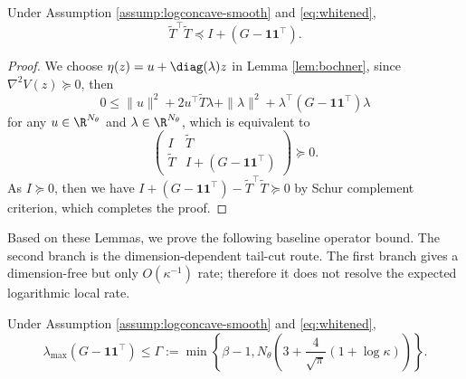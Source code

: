 \begin{lemma}\label{lem:matrix-schur}
    Under Assumption \ref{assump:logconcave-smooth} and \eqref{eq:whitened}, 
    \begin{equation*}
        \widetilde{T}^\top \widetilde{T} \preceq I + (G - \mathbf{1} \mathbf{1}^\top).
    \end{equation*}
\end{lemma}

\begin{proof}
    We choose $\eta (z) = u + \diag (\lambda) z$ in Lemma \ref{lem:bochner}, since $\nabla^2 V(z) \succeq 0$, then
    \begin{equation*}
        0 \leq  \|u\|^2 + 2 u^\top \widetilde{T} \lambda + \|\lambda\|^2 + \lambda^\top (G - \mathbf{1} \mathbf{1}^\top) \lambda
    \end{equation*}
    for any $u \in \R^{N_\theta}$ and $\lambda \in \R^{N_\theta}$, which is equivalent to 
    \begin{equation*}
        \begin{pmatrix}
            I & \widetilde{T} \\
            \widetilde{T} & I + (G - \mathbf{1} \mathbf{1}^\top)
        \end{pmatrix} \succeq 0.
    \end{equation*}
    As $I \succeq 0$, then we have $I + (G - \mathbf{1} \mathbf{1}^\top) - \widetilde{T}^\top \widetilde{T} \succeq 0$ by Schur complement criterion, which completes the proof.
\end{proof}

Based on these Lemmas, we prove the following baseline operator bound. The second branch is the dimension-dependent tail-cut route. The first branch gives a dimension-free but only $O(\kappa^{-1})$ rate; therefore it does not resolve the expected logarithmic local rate.

\begin{lemma}\label{lem:operator-bound}
    Under Assumption \ref{assump:logconcave-smooth} and \eqref{eq:whitened}, 
    \begin{equation*}
        \lambda_{\max} (G - \mathbf{1} \mathbf{1}^\top) \leq \Gamma := \min \left\{\beta - 1, N_\theta \left(3 + \frac{4}{\sqrt{\pi}} (1 + \log \kappa) \right) \right\}.
    \end{equation*}
\end{lemma}

